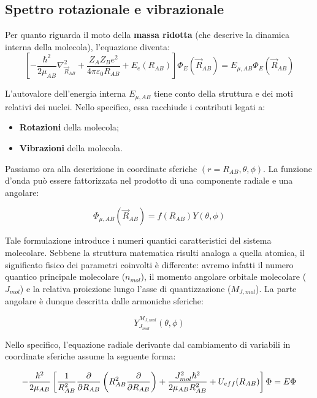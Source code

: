 \subsection{Spettro rotazionale e vibrazionale}

Per quanto riguarda il moto della \textbf{massa ridotta} (che descrive la dinamica interna della molecola), l'equazione diventa:
\begin{equation}
    \left[ -\frac{\hbar^2}{2\mu_{AB}} \nabla_{\vec{R}_{AB}}^2 + \frac{Z_A Z_B e^2}{4\pi\varepsilon_0 R_{AB}} + E_e(R_{AB}) \right] \Phi_E(\vec{R}_{AB}) = E_{\mu, AB} \Phi_E(\vec{R}_{AB})
\end{equation}

L'autovalore dell'energia interna \(E_{\mu, AB}\) tiene conto della struttura e dei moti relativi dei nuclei. Nello specifico, essa racchiude i contributi legati a:
\begin{itemize}
    \item \textbf{Rotazioni} della molecola;
    \item \textbf{Vibrazioni} della molecola.
\end{itemize}


Passiamo ora alla descrizione in coordinate sferiche \( (r = R_{AB}, \theta, \phi) \). La funzione d'onda può essere fattorizzata nel prodotto di una componente radiale e una angolare:

\begin{equation}
    \Phi_{\mu, AB}(\vec{R}_{AB}) = f(R_{AB}) Y(\theta, \phi)
\end{equation}

Tale formulazione introduce i numeri quantici caratteristici del sistema molecolare. Sebbene la struttura matematica risulti analoga a quella atomica, il significato fisico dei parametri coinvolti è differente: avremo infatti il numero quantico principale molecolare (\(n_{mol}\)), il momento angolare orbitale molecolare (\(J_{mol}\)) e la relativa proiezione lungo l'asse di quantizzazione (\(M_{J, mol}\)). La parte angolare è dunque descritta dalle armoniche sferiche:

\begin{equation}
    Y_{J_{mol}}^{M_{J, mol}}(\theta, \phi)
\end{equation}

Nello specifico, l'equazione radiale derivante dal cambiamento di variabili in coordinate sferiche assume la seguente forma:

\begin{equation}
    -\frac{\hbar^2}{2\mu_{AB}} \left[ \frac{1}{R_{AB}^2} \pdv{R_{AB}} \left( R_{AB}^2 \pdv{R_{AB}} \right) + \frac{J_{mol}^2 \hbar^2}{2\mu_{AB} R_{AB}^2} + U_{eff}(R_{AB}) \right] \Phi = E \Phi
\end{equation}

